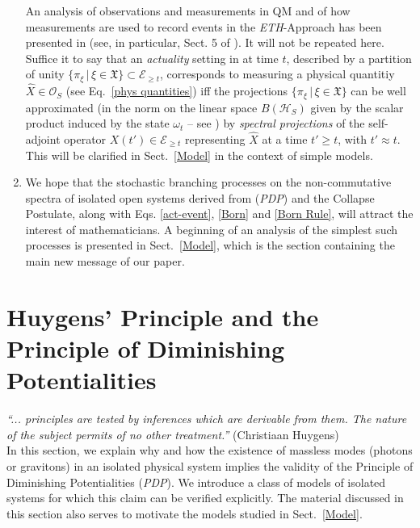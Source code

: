 \documentclass[12pt]{article}
\begin{document}
\begin{enumerate}
{An analysis of observations and measurements in QM and of how measurements are used to record
events in the \textit{ETH}-Approach has been presented in \cite{Fr1, Fr2} (see, in particular, Sect. 5 of \cite{Fr2}).
It will not be repeated here. Suffice it to say that  an \textit{actuality} setting in at time $t$,
described by a partition of unity $\big\{\pi_{\xi}\,\vert\, \xi \in \mathfrak{X}\big\}\subset \mathcal{E}_{\geq t}$, corresponds
to measuring a physical quantitiy $\hat{X}\in \mathcal{O}_S$ (see Eq.~\eqref{phys quantities}) iff the projections
$\big\{\pi_{\xi}\,\vert\, \xi \in \mathfrak{X}\big\}$ can be well approximated (in the norm on the linear space $B(\mathcal{H}_S)$
given by the scalar product induced by the state $\omega_t$ -- see \cite{Fr1, Fr2}) by \textit{spectral projections} of the self-adjoint operator $X(t')\in \mathcal{E}_{\geq t}$ representing $\hat{X}$ at a time $t'\geq t$, with $t' \approx t$. This will be clarified in Sect.~\ref{Model} in the context of simple models.
}
\item{We hope that the stochastic branching processes on the non-commutative spectra of isolated open systems
derived from (\textit{PDP}) and the Collapse Postulate, along with Eqs. \eqref{act-event}, \eqref{Born} and \eqref{Born Rule},
will attract the interest of mathematicians. A beginning of an analysis of the simplest such processes is presented in Sect.~\ref{Model}, which is the section containing the main new message of our paper.}
\end{enumerate}

\section{Huygens' Principle and the Principle of Diminishing Potentialities}\label{HP}
\hspace{0.5cm}\textit{``... principles are tested by inferences which are derivable from them. The nature of the subject permits of no other treatment.''} (Christiaan Huygens)\\

In this section, we explain why and how the existence of massless modes (photons or gravitons) in an isolated physical
system implies the validity of the Principle of Diminishing Potentialities (\textit{PDP}). We introduce a class of models of
isolated systems for which this claim can be verified explicitly. The material discussed in this section also serves
to motivate the models studied in Sect.~\ref{Model}.
\end{document}
